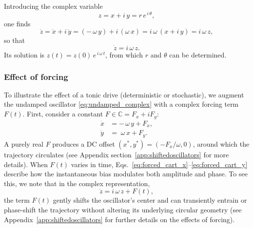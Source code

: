 \documentclass[12pt]{article}
\numberwithin{equation}{section}
\begin{document}
Introducing the complex variable
\begin{equation}
    z = x + i\,y = r\,e^{\,i\,\theta},
    \label{eq:undamped_complex_z}
\end{equation}
one finds
\begin{equation}
    \dot{z} = \dot{x} + i\,\dot{y}
            = (-\,\omega\,y) + i\,(\omega\,x)
            = i\,\omega\,(x + i\,y)
            = i\,\omega\,z,    
\end{equation}
so that
\begin{equation}
    \dot{z} = i\,\omega\,z.
    \label{eq:undamped_complex}
\end{equation}
Its solution is $z(t) = z(0)\,e^{\,i\,\omega\,t}$, from which $r$ and $\theta$ can be determined.


\subsubsection{Effect of forcing}

To illustrate the effect of a tonic drive (deterministic or stochastic), we augment the undamped oscillator \eqref{eq:undamped_complex}
with a complex forcing term \(F(t)\). First, consider a constant \(F\in\mathbb{C}=F_x+iF_y\):
\begin{align}
\dot x &= -\,\omega\,y + F_x,
\label{eq:forced_cart_x}\\
\dot y &= \;\omega\,x + F_y.
\label{eq:forced_cart_y}
\end{align}
A purely real \(F\) produces a DC offset \((x^*,y^*) = (-F_x/\omega,0)\), around which the trajectory circulates (see Appendix section~\ref{app:shiftedoscillators} for more details). When \(F(t)\) varies in time, Eqs.~\eqref{eq:forced_cart_x}–\eqref{eq:forced_cart_y} describe how the instantaneous bias modulates both amplitude and phase.
To see this, we note that in the complex representation,
\begin{equation}
\dot z = i\,\omega\,z + F(t),
\label{eq:forced_time_complex}
\end{equation}
the term \(F(t)\) gently shifts the oscillator’s center and can transiently entrain or phase‐shift the trajectory without altering its underlying circular geometry (see Appendix~\ref{app:shiftedoscillators} for further details on the effects of forcing).
\end{document}

